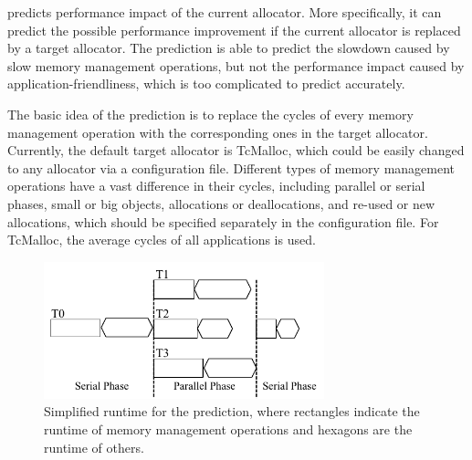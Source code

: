 \MP{} predicts performance impact of the current allocator. More specifically, it can predict the possible performance improvement if the current allocator is replaced by a target allocator. The prediction is able to predict the slowdown caused by slow memory management operations, but not the performance impact caused by application-friendliness, which is too complicated to predict accurately. 

The basic idea of the prediction is to replace the cycles of every memory management operation with the corresponding ones in the target allocator. Currently, the default target allocator is TcMalloc, which could be easily changed to any allocator via a configuration file. Different types of memory management operations have a vast difference in their cycles, including parallel or serial phases, small or big objects, allocations or deallocations, and re-used or new allocations, which should be specified separately in the configuration file. For TcMalloc, the average cycles of all applications is used. 

 



\begin{figure}[!ht]
\centering
\includegraphics[width=3.2in]{figures/forkjoin}
\caption{Simplified runtime for the prediction, where rectangles indicate the runtime of memory management operations and hexagons are the runtime of others. \label{fig:time}}
\end{figure}

